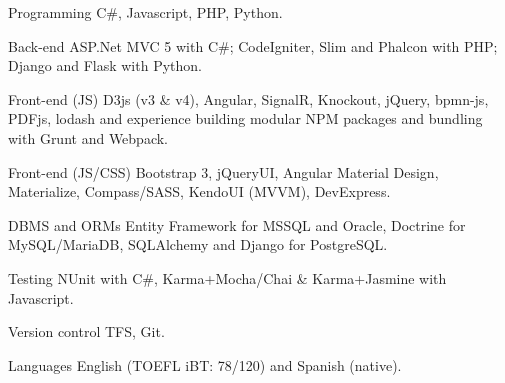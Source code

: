 


\begin{cvskills}


\cvskill
{Programming} %
{C\#, Javascript, PHP, Python.} %


\cvskill
{Back-end} %
{ASP.Net MVC 5 with C\#; CodeIgniter, Slim and Phalcon with PHP; Django and Flask with Python.} %


\cvskill
{Front-end (JS)} %
{\newline D3js (v3 \& v4), Angular, SignalR, Knockout, jQuery, bpmn-js, PDFjs, lodash and experience building modular NPM packages and bundling with Grunt and Webpack.} %
	

\cvskill
{Front-end (JS/CSS)} %
{Bootstrap 3, jQueryUI, Angular Material Design, Materialize, Compass/SASS, KendoUI (MVVM), DevExpress.} %


\cvskill
{DBMS and ORMs} %
{\newline Entity Framework for MSSQL and Oracle, Doctrine for MySQL/MariaDB, SQLAlchemy and Django for PostgreSQL.} %



\cvskill
{Testing} %
{NUnit with C\#, Karma+Mocha/Chai \& Karma+Jasmine with Javascript.} %



\cvskill
{Version control} %
{TFS, Git.} %



\cvskill
{Languages} %
{English (TOEFL iBT: 78/120) and Spanish (native).} %


\end{cvskills}
